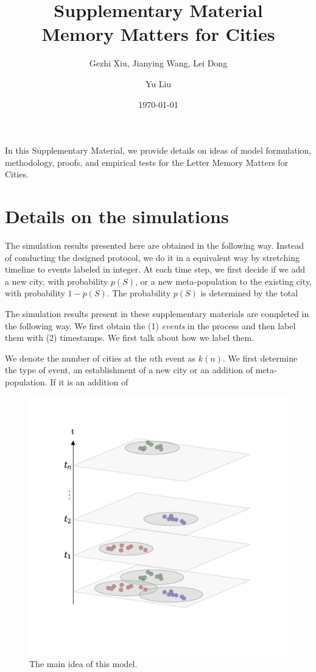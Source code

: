 \documentclass[aps,prl]{revtex4-1}
\begin{document}
\title{Supplementary Material\\Memory Matters for Cities}
\date{\today}
\author{Gezhi Xiu, Jianying Wang, Lei Dong}

\author{Yu Liu}

\pacs{} 



\maketitle
\tableofcontents
\vspace{1cm}

In this Supplementary Material, we provide details on ideas of model formulation, methodology, proofs, and empirical tests for the Letter Memory Matters for Cities.
\section{Details on the simulations}

The simulation results presented here are obtained in the following way. Instead of conducting the designed protocol, we do it in a equivalent way by stretching timeline to events labeled in integer. At each time step, we first decide if we add a new city, with probability $p(S)$, or a new meta-population to the existing city, with probability $1-p(S)$. The probability $p(S)$ is determined by the total 

The simulation results present in these supplementary materials are completed in the following way. We first obtain the (1) \emph{events} in the process and then label them with (2) timestamps. We first talk about how we label them. 

We denote the number of cities at the $n$th event as $k(n)$. We first determine the type of event, an establishment of a new city or an addition of meta-population. If it is an addition of 

\begin{figure}
	\centering
	\includegraphics[width=0.5\linewidth]{./fig/mechan.pdf}
	\caption{The main idea of this model.}
\end{figure}
\end{document}
